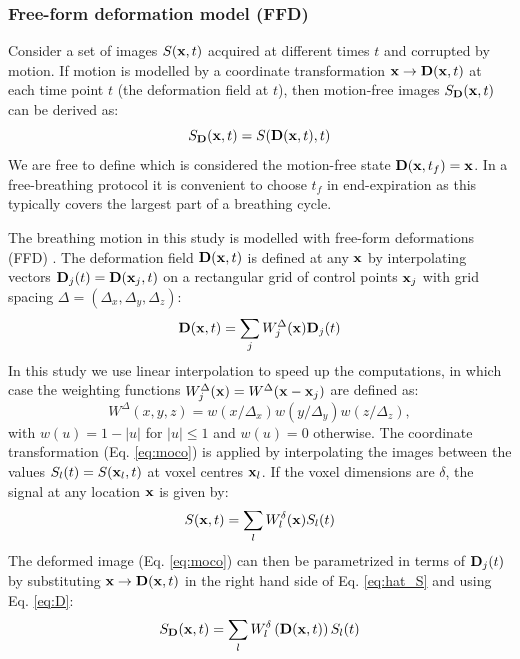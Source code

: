 \documentclass[num-refs]{wiley-article}
\newcommand{\x}{{\bf x}}
\newcommand{\D}{{\bf D}}
\begin{document}
\subsubsection{Free-form deformation model (FFD)}

Consider a set of images $S(\x, t)$ acquired at different times $t$ and corrupted by motion. If motion is modelled by a coordinate transformation $\x\to\D(\x,t)$ at each time point $t$ (the deformation field at $t$), then motion-free images $S_\D(\x, t)$ can be derived as:
\begin{equation}\label{eq:moco}
S_\D(\x, t) = S(\D(\x,t), t) 
\end{equation}
We are free to define which is considered the motion-free state $\D(\x,t_f) = \x$. In a free-breathing protocol it is convenient to choose $t_f$ in end-expiration as this typically covers the largest part of a breathing cycle.

The breathing motion in this study is modelled with free-form deformations (FFD) \cite{Rueckert1999}. The deformation field $\D(\x, t)$ is defined at any $\x$ by interpolating vectors $\D_j(t) = \D(\x_j, t)$ on a rectangular grid of control points $\x_j$ with grid spacing $\Delta = (\Delta_x, \Delta_y, \Delta_z)$:
\begin{equation}
\label{eq:D}
\D(\x,t) = \sum_j W^{\Delta}_j(\x)\D_j(t)
\end{equation}
In this study we use linear interpolation to speed up the computations, in which case the weighting functions $W^\Delta_j(\x) = W^\Delta(\x-\x_j)$ are defined as:
\begin{equation}\label{eq:weighting}
W^\Delta(x, y, z) = w(x/\Delta_x)w(y/\Delta_y)w(z/\Delta_z),
\end{equation}
with $w(u) = 1-|u|$ for $|u|\leq 1$ and $w(u) = 0$ otherwise. The coordinate transformation (Eq. \ref{eq:moco}) is applied by interpolating the images between the values $S_l(t) = S(\x_l, t)$ at voxel centres $\x_l$. If the voxel dimensions are $\delta$, the signal at any location $\x$ is given by:
\begin{equation}
\label{eq:hat_S}
S (\x, t) = \sum_l W^{\delta}_l(\x)S_l(t)
\end{equation}
The deformed image (Eq. \ref{eq:moco}) can then be parametrized in terms of $\D_j(t)$ by substituting $\x\to \D(\x,t)$ in the right hand side of Eq. \ref{eq:hat_S} and using Eq. \ref{eq:D}:
\begin{equation}
\label{eq:explicit}
S_\D(\x, t) = \sum_l W^{\delta}_l\left(\D (\x, t)\right)S_l(t)
\end{equation}
\end{document}
